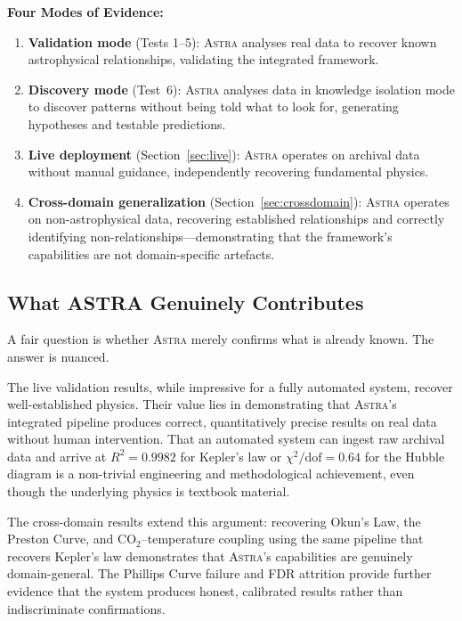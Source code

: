 \documentclass[usenatbib]{rasti}
\newcommand{\astra}{\textsc{Astra}\xspace}
\begin{document}
\textbf{Four Modes of Evidence:}
\begin{enumerate}
  \item[(i)] \textbf{Validation mode} (Tests 1--5): \astra analyses real data to recover known astrophysical relationships, validating the integrated framework.
  \item[(ii)] \textbf{Discovery mode} (Test~6): \astra analyses data in knowledge isolation mode to discover patterns without being told what to look for, generating hypotheses and testable predictions.
  \item[(iii)] \textbf{Live deployment} (Section~\ref{sec:live}): \astra operates on archival data without manual guidance, independently recovering fundamental physics.
  \item[(iv)] \textbf{Cross-domain generalization} (Section~\ref{sec:crossdomain}): \astra operates on non-astrophysical data, recovering established relationships and correctly identifying non-relationships---demonstrating that the framework's capabilities are not domain-specific artefacts.
\end{enumerate}

\subsection{What ASTRA Genuinely Contributes}
\label{sec:discussion:contributions}

A fair question is whether \astra merely confirms what is already known.
The answer is nuanced.

The live validation results, while impressive for a fully automated system, recover well-established physics.
Their value lies in demonstrating that \astra's integrated pipeline produces correct, quantitatively precise results on real data without human intervention.
That an automated system can ingest raw archival data and arrive at $R^{2}=0.9982$ for Kepler's law or $\chi^{2}/\mathrm{dof}=0.64$ for the Hubble diagram is a non-trivial engineering and methodological achievement, even though the underlying physics is textbook material.

The cross-domain results extend this argument: recovering Okun's Law, the Preston Curve, and CO$_{2}$--temperature coupling using the same pipeline that recovers Kepler's law demonstrates that \astra's capabilities are genuinely domain-general.
The Phillips Curve failure and FDR attrition provide further evidence that the system produces honest, calibrated results rather than indiscriminate confirmations.
\end{document}
